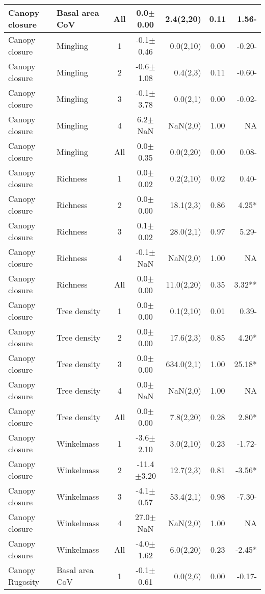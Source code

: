 \begin{longtable}{llcS[table-format=5.1(4.2)]rS[table-format=1.2]r}
  Canopy closure & Basal area CoV & All & 0.0$\pm$0.00 & 2.4(2,20) & 0.11 & 1.56- \\ 
   \midrule
Canopy closure & Mingling & 1 & -0.1$\pm$0.46 & 0.0(2,10) & 0.00 & -0.20- \\ 
  Canopy closure & Mingling & 2 & -0.6$\pm$1.08 & 0.4(2,3) & 0.11 & -0.60- \\ 
  Canopy closure & Mingling & 3 & -0.1$\pm$3.78 & 0.0(2,1) & 0.00 & -0.02- \\ 
  Canopy closure & Mingling & 4 & 6.2$\pm$NaN & NaN(2,0) & 1.00 & NA \\ 
  Canopy closure & Mingling & All & 0.0$\pm$0.35 & 0.0(2,20) & 0.00 & 0.08- \\ 
   \midrule
Canopy closure & Richness & 1 & 0.0$\pm$0.02 & 0.2(2,10) & 0.02 & 0.40- \\ 
  Canopy closure & Richness & 2 & 0.0$\pm$0.00 & 18.1(2,3) & 0.86 & 4.25* \\ 
  Canopy closure & Richness & 3 & 0.1$\pm$0.02 & 28.0(2,1) & 0.97 & 5.29- \\ 
  Canopy closure & Richness & 4 & -0.1$\pm$NaN & NaN(2,0) & 1.00 & NA \\ 
  Canopy closure & Richness & All & 0.0$\pm$0.00 & 11.0(2,20) & 0.35 & 3.32** \\ 
   \midrule
Canopy closure & Tree density & 1 & 0.0$\pm$0.00 & 0.1(2,10) & 0.01 & 0.39- \\ 
  Canopy closure & Tree density & 2 & 0.0$\pm$0.00 & 17.6(2,3) & 0.85 & 4.20* \\ 
  Canopy closure & Tree density & 3 & 0.0$\pm$0.00 & 634.0(2,1) & 1.00 & 25.18* \\ 
  Canopy closure & Tree density & 4 & 0.0$\pm$NaN & NaN(2,0) & 1.00 & NA \\ 
  Canopy closure & Tree density & All & 0.0$\pm$0.00 & 7.8(2,20) & 0.28 & 2.80* \\ 
   \midrule
Canopy closure & Winkelmass & 1 & -3.6$\pm$2.10 & 3.0(2,10) & 0.23 & -1.72- \\ 
  Canopy closure & Winkelmass & 2 & -11.4$\pm$3.20 & 12.7(2,3) & 0.81 & -3.56* \\ 
  Canopy closure & Winkelmass & 3 & -4.1$\pm$0.57 & 53.4(2,1) & 0.98 & -7.30- \\ 
  Canopy closure & Winkelmass & 4 & 27.0$\pm$NaN & NaN(2,0) & 1.00 & NA \\ 
  Canopy closure & Winkelmass & All & -4.0$\pm$1.62 & 6.0(2,20) & 0.23 & -2.45* \\ 
   \midrule
Canopy Rugosity & Basal area CoV & 1 & -0.1$\pm$0.61 & 0.0(2,6) & 0.00 & -0.17- \\ 

\end{longtable}
